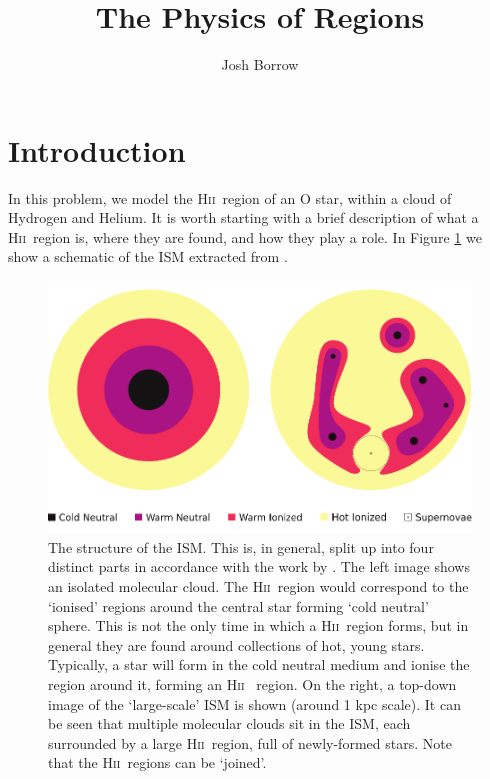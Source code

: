 \documentclass[a4paper]{article}
\title{The Physics of \hii Regions}\label{the-physics-of-hii-regions}
\author{Josh Borrow}
\newcommand{\hii}{H\textsc{ii}~}
\begin{document}
\maketitle

\section{Introduction}

In this problem, we model the \hii region of an O star, within a cloud of
Hydrogen and Helium. It is worth starting with a brief description of what a
\hii region is, where they are found, and how they play a role. In Figure
\ref{fig:hiidiagram} we show a schematic of the ISM extracted from
\citet{borrow_towards_2017}.

\begin{figure}[!h]
    \centering
    \includegraphics[width=\textwidth]{structure.pdf}
    \caption{\small The structure of the ISM. This is, in general, split up into four
        distinct parts in accordance with the work by
        \citet{mckee_theory_1977}.  The left image shows an isolated molecular
        cloud. The \hii region would correspond to the `ionised' regions around
        the central star forming `cold neutral' sphere. This is not the only
        time in which a \hii region forms, but in general they are found around
        collections of hot, young stars. Typically, a star will form in the
        cold neutral medium and ionise the region around it, forming an \hii
        region. On the right, a top-down image of the `large-scale' ISM is
        shown (around 1 kpc scale). It can be seen that multiple molecular
        clouds sit in the ISM, each surrounded by a large \hii region, full of
        newly-formed stars. Note that the \hii regions can be `joined'.}
    \label{fig:hiidiagram}
\end{figure}
\end{document}
